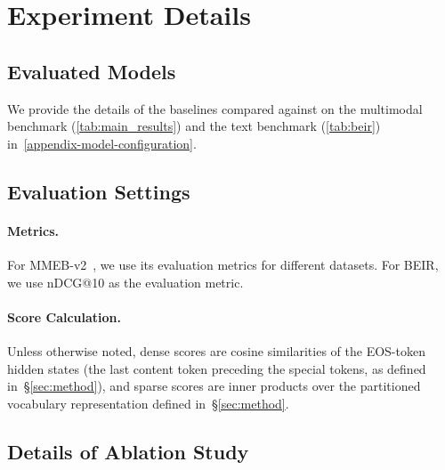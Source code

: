
\section{Experiment Details}\label{sec:appendix-experiment-details}

\subsection{Evaluated Models}
We provide the details of the baselines compared against \ours on the multimodal benchmark \mmebv (\autoref{tab:main_results}) and the text benchmark \beir (\autoref{tab:beir}) in~\autoref{appendix-model-configuration}.



\subsection{Evaluation Settings}

\paragraph{Metrics.} For MMEB-v2~\citep{vlm2vecv2}, we use its evaluation metrics for different datasets. For BEIR, we use nDCG@10 as the evaluation metric.

\paragraph{Score Calculation.} Unless otherwise noted, dense scores are cosine similarities of the EOS-token hidden states (\ie the last content token preceding the special tokens, as defined in~\S\ref{sec:method}), and sparse scores are inner products over the partitioned vocabulary representation defined in~\S\ref{sec:method}. 
 
\subsection{Details of Ablation Study}\label{sec:appendix-ablation-study}

